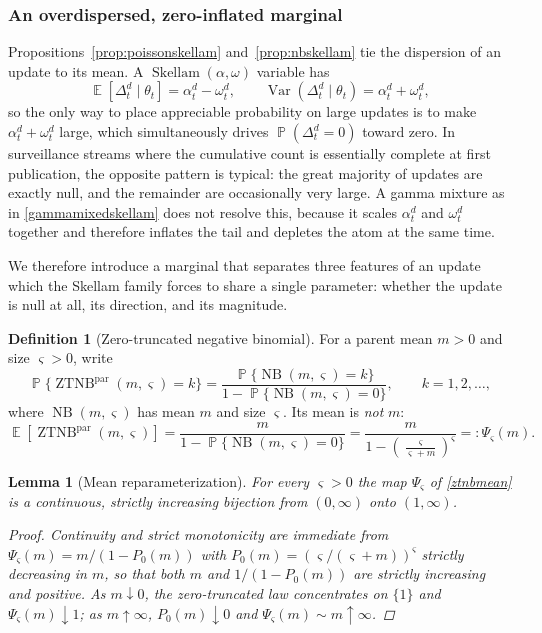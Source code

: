 \documentclass{article}
\newtheorem{lemma}{Lemma}
\theoremstyle{definition}
\newtheorem{definition}{Definition}
\theoremstyle{remark}
\newcommand{\NB}{\operatorname{NB}}
\newcommand{\Sk}{\operatorname{Skellam}}
\newcommand{\E}{\operatorname{\mathbb{E}}}
\newcommand{\Var}{\operatorname{Var}}
\newcommand{\Prb}{\operatorname{\mathbb{P}}}
\begin{document}
\subsubsection{An overdispersed, zero-inflated marginal}
\label{sec:ztnb}

Propositions~\ref{prop:poissonskellam} and~\ref{prop:nbskellam} tie the
dispersion of an update to its mean. A $\Sk(\alpha,\omega)$ variable has
\begin{equation}
    \E[\Delta_t^d\mid\theta_t]=\alpha_t^d-\omega_t^d,
    \qquad
    \Var(\Delta_t^d\mid\theta_t)=\alpha_t^d+\omega_t^d,
\end{equation}
so the only way to place appreciable probability on large updates is to make
$\alpha_t^d+\omega_t^d$ large, which simultaneously drives
$\Prb(\Delta_t^d=0)$ toward zero. In surveillance streams where the cumulative
count is essentially complete at first publication, the opposite pattern is
typical: the great majority of updates are exactly null, and the remainder are
occasionally very large. A gamma mixture as in \eqref{gammamixedskellam} does not
resolve this, because it scales $\alpha_t^d$ and $\omega_t^d$ together and
therefore inflates the tail and depletes the atom at the same time.

We therefore introduce a marginal that separates three features of an update
which the Skellam family forces to share a single parameter: whether the update
is null at all, its direction, and its magnitude.

\begin{definition}[Zero-truncated negative binomial]
For a parent mean $m>0$ and size $\varsigma>0$, write
\begin{equation}\label{ztnbpmf}
    \Prb\{\operatorname{ZTNB}^{\mathrm{par}}(m,\varsigma)=k\}
    =
    \frac{\Prb\{\NB(m,\varsigma)=k\}}
         {1-\Prb\{\NB(m,\varsigma)=0\}},
    \qquad k=1,2,\dots,
\end{equation}
where $\NB(m,\varsigma)$ has mean $m$ and size $\varsigma$. Its mean is
\emph{not} $m$:
\begin{equation}\label{ztnbmean}
    \E\left[\operatorname{ZTNB}^{\mathrm{par}}(m,\varsigma)\right]
    =
    \frac{m}{1-\Prb\{\NB(m,\varsigma)=0\}}
    =
    \frac{m}{1-\left(\frac{\varsigma}{\varsigma+m}\right)^{\varsigma}}
    =:
    \Psi_\varsigma(m).
\end{equation}
\end{definition}

\begin{lemma}[Mean reparameterization]\label{lem:ztnbmean}
For every $\varsigma>0$ the map $\Psi_\varsigma$ of \eqref{ztnbmean} is a
continuous, strictly increasing bijection from $(0,\infty)$ onto $(1,\infty)$.
\begin{proof}
Continuity and strict monotonicity are immediate from
$\Psi_\varsigma(m)=m/(1-P_0(m))$ with $P_0(m)=(\varsigma/(\varsigma+m))^\varsigma$
strictly decreasing in $m$, so that both $m$ and $1/(1-P_0(m))$ are strictly
increasing and positive. As $m\downarrow0$, the zero-truncated law concentrates
on $\{1\}$ and $\Psi_\varsigma(m)\downarrow1$; as $m\uparrow\infty$,
$P_0(m)\downarrow0$ and $\Psi_\varsigma(m)\sim m\uparrow\infty$.
\end{proof}
\end{lemma}
\end{document}
